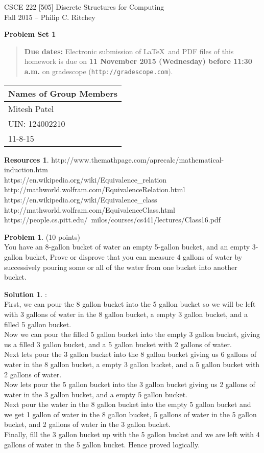 \documentclass{article}
\theoremstyle{definition}
\newtheorem{problem}{Problem}
\newtheorem*{solution}{Solution}
\newtheorem*{resources}{Resources}
\newcommand{\names}[3]{
\begin{center}
\begin{tabular}{|l|}
\hline
\textbf{Names of Group Members}\\
\hline
#1 \\
#2 \\
#3 \\
\hline
\end{tabular}
\end{center}
}
\newcommand{\problemset}[1]{\begin{center}\textbf{Problem Set #1}\end{center}}
\newcommand{\duedate}[1]{\begin{quote}\textbf{Due dates:} Electronic
    submission of \LaTeX\ and PDF files of this homework is due on
    \textbf{#1} on gradescope (\texttt{http://gradescope.com}). 
    \end{quote}}
\begin{document}
\begin{center}
{\large
CSCE 222 [505] Discrete Structures for Computing\\[.5ex]
Fall 2015 -- Philip C. Ritchey\\}
\end{center}

\problemset{1}

\duedate{11 November 2015 (Wednesday) before 11:30 a.m.}

\names{Mitesh Patel}
{UIN: 124002210}
{11-8-15}

\begin{resources} 
http://www.themathpage.com/aprecalc/mathematical-induction.htm \\
https://en.wikipedia.org/wiki/Equivalence\_relation\\
http://mathworld.wolfram.com/EquivalenceRelation.html \\
https://en.wikipedia.org/wiki/Equivalence\_class\\
http://mathworld.wolfram.com/EquivalenceClass.html\\
https://people.cs.pitt.edu/~milos/courses/cs441/lectures/Class16.pdf
\end{resources}

\bigskip

\begin{problem} (10 points) \\
You have an 8-gallon bucket of water an empty 5-gallon bucket, and an empty 3-gallon bucket,  Prove or disprove that you can measure 4 gallons of water by successively pouring some or all of the water from one bucket into another bucket.
\end{problem}
\begin{solution} : \\
First, we can pour the 8 gallon bucket into the 5 gallon bucket so we will be left with 3 gallons of water in the 8 gallon bucket, a empty 3 gallon bucket, and a filled 5 gallon bucket. \\
Now we can pour the filled 5 gallon bucket into the empty 3 gallon bucket, giving us a filled 3 gallon bucket, and a 5 gallon bucket with 2 gallons of water. \\
Next lets pour the 3 gallon bucket into the 8 gallon bucket giving us 6 gallons of water in the 8 gallon bucket, a empty 3 gallon bucket, and a 5 gallon bucket with 2 gallons of water. \\
Now lets pour the 5 gallon bucket into the 3 gallon bucket giving us 2 gallons of water in the 3 gallon bucket, and a empty 5 gallon bucket. \\
Next pour the water in the 8 gallon bucket into the empty 5 gallon bucket and we get 1 gallon of water in the 8 gallon bucket, 5 gallons of water in the 5 gallon bucket, and 2 gallons of water in the 3 gallon bucket. \\
Finally, fill the 3 gallon bucket up with the 5 gallon bucket and we are left with 4 gallons of water in the 5 gallon bucket. Hence proved logically.

\end{solution}
\end{document}
